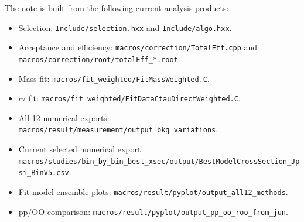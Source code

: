 \documentclass[11pt]{article}
\begin{document}
The note is built from the following current analysis products:
\begin{itemize}
  \item Selection: \texttt{Include/selection.hxx} and \texttt{Include/algo.hxx}.
  \item Acceptance and efficiency: \texttt{macros/correction/TotalEff.cpp} and \texttt{macros/correction/root/totalEff\_*.root}.
  \item Mass fit: \texttt{macros/fit\_weighted/FitMassWeighted.C}.
  \item $c\tau$ fit: \texttt{macros/fit\_weighted/FitDataCtauDirectWeighted.C}.
  \item All-12 numerical exports: \texttt{macros/result/measurement/output\_bkg\_variations}.
  \item Current selected numerical export: \texttt{macros/studies/bin\_by\_bin\_best\_xsec/output/BestModelCrossSection\_Jpsi\_BinV5.csv}.
  \item Fit-model ensemble plots: \texttt{macros/result/pyplot/output\_all12\_methods}.
  \item pp/OO comparison: \texttt{macros/result/pyplot/output\_pp\_oo\_roo\_from\_jun}.
\end{itemize}


\end{document}
